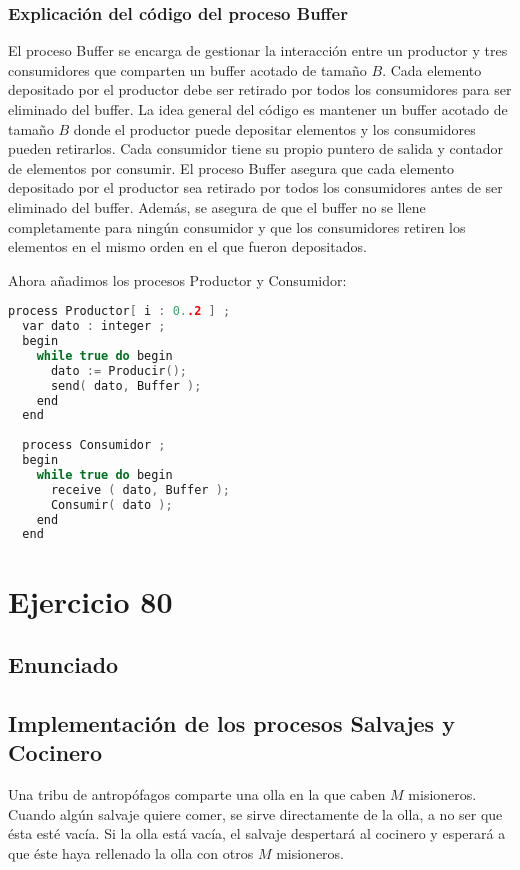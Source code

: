 \documentclass[a4paper,12pt]{article}
\begin{document}
\subsubsection*{Explicación del código del proceso Buffer}

El proceso Buffer se encarga de gestionar la interacción entre un productor y tres consumidores que comparten un buffer acotado de tamaño \( B \). Cada elemento depositado por el productor debe ser retirado por todos los consumidores para ser eliminado del buffer.
La idea general del código es mantener un buffer acotado de tamaño \( B \) donde el productor puede depositar elementos y los consumidores pueden retirarlos. Cada consumidor tiene su propio puntero de salida y contador de elementos por consumir. El proceso Buffer asegura que cada elemento depositado por el productor sea retirado por todos los consumidores antes de ser eliminado del buffer. Además, se asegura de que el buffer no se llene completamente para ningún consumidor y que los consumidores retiren los elementos en el mismo orden en el que fueron depositados.


Ahora añadimos los procesos Productor y Consumidor:

\begin{lstlisting}[language=C++]
  process Productor[ i : 0..2 ] ;
  var dato : integer ;
  begin
    while true do begin
      dato := Producir();
      send( dato, Buffer );
    end
  end
  
  process Consumidor ;
  begin
    while true do begin
      receive ( dato, Buffer );
      Consumir( dato );
    end
  end

\end{lstlisting}

    




\section{Ejercicio 80}

\subsection{Enunciado}

\subsection*{Implementación de los procesos Salvajes y Cocinero}

Una tribu de antropófagos comparte una olla en la que caben \(M\) misioneros. Cuando algún salvaje quiere comer, se sirve directamente de la olla, a no ser que ésta esté vacía. Si la olla está vacía, el salvaje despertará al cocinero y esperará a que éste haya rellenado la olla con otros \(M\) misioneros.
\end{document}
